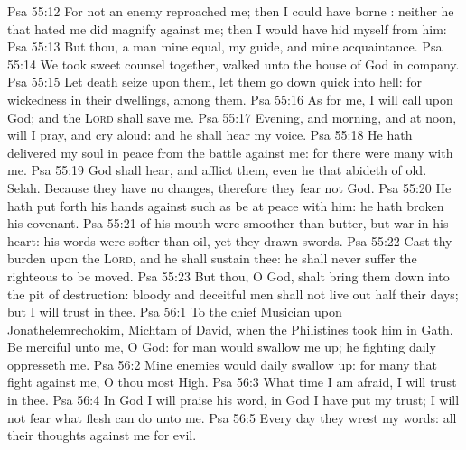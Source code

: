 \vs Psa 55:12 For  not an enemy  reproached me; then I could have borne : neither  he that hated me  did magnify  against me; then I would have hid myself from him:
\vs Psa 55:13 But  thou, a man mine equal, my guide, and mine acquaintance.
\vs Psa 55:14 We took sweet counsel together,  walked unto the house of God in company.
\vs Psa 55:15 Let death seize upon them,  let them go down quick into hell: for wickedness  in their dwellings,  among them.
\vs Psa 55:16 As for me, I will call upon God; and the \textsc{Lord} shall save me.
\vs Psa 55:17 Evening, and morning, and at noon, will I pray, and cry aloud: and he shall hear my voice.
\vs Psa 55:18 He hath delivered my soul in peace from the battle  against me: for there were many with me.
\vs Psa 55:19 God shall hear, and afflict them, even he that abideth of old. Selah. Because they have no changes, therefore they fear not God.
\vs Psa 55:20 He hath put forth his hands against such as be at peace with him: he hath broken his covenant.
\vs Psa 55:21  of his mouth were smoother than butter, but war  in his heart: his words were softer than oil, yet  they drawn swords.
\vs Psa 55:22 Cast thy burden upon the \textsc{Lord}, and he shall sustain thee: he shall never suffer the righteous to be moved.
\vs Psa 55:23 But thou, O God, shalt bring them down into the pit of destruction: bloody and deceitful men shall not live out half their days; but I will trust in thee.
\vs Psa 56:1 To the chief Musician upon Jonathelemrechokim, Michtam of David, when the Philistines took him in Gath. Be merciful unto me, O God: for man would swallow me up; he fighting daily oppresseth me.
\vs Psa 56:2 Mine enemies would daily swallow  up: for  many that fight against me, O thou most High.
\vs Psa 56:3 What time I am afraid, I will trust in thee.
\vs Psa 56:4 In God I will praise his word, in God I have put my trust; I will not fear what flesh can do unto me.
\vs Psa 56:5 Every day they wrest my words: all their thoughts  against me for evil.
